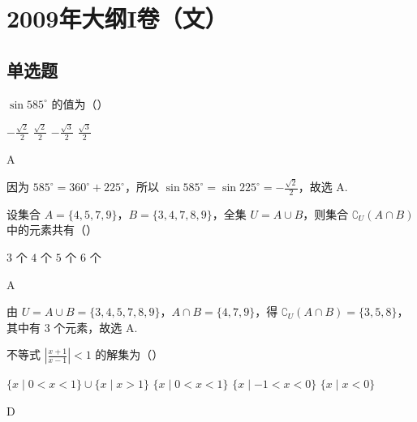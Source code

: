 \chapter{2009年大纲I卷（文）}

\section{单选题}

\begin{problem}
\(\sin 585^{\circ}\) 的值为（\quad）

\choices
    {\(-\frac{\sqrt{2}}{2}\)}
    {\(\frac{\sqrt{2}}{2}\)}
    {\(-\frac{\sqrt{3}}{2}\)}
    {\(\frac{\sqrt{3}}{2}\)}
\end{problem}

\begin{answer}
A
\end{answer}

\begin{solution}
因为 \(585^{\circ}=360^{\circ}+225^{\circ}\)，所以 \(\sin 585^{\circ}=\sin 225^{\circ}=-\frac{\sqrt{2}}{2}\)，故选 A.
\end{solution}

\begin{problem}
设集合 \(A = \{4, 5, 7, 9\}\)，\(B = \{3, 4, 7, 8, 9\}\)，全集 \(U = A \cup B\)，则集合 \(\complement_U (A \cap B)\) 中的元素共有（\quad）

\choices
    {\(3\text{ 个}\)}
    {\(4\text{ 个}\)}
    {\(5\text{ 个}\)}
    {\(6\text{ 个}\)}
\end{problem}

\begin{answer}
A
\end{answer}

\begin{solution}
由 \(U=A\cup B=\{3,4,5,7,8,9\}\)，\(A\cap B=\{4,7,9\}\)，得 \(\complement_U(A\cap B)=\{3,5,8\}\)，其中有 \(3\) 个元素，故选 A.
\end{solution}

\begin{problem}
不等式 \(\left|\frac{x + 1}{x - 1}\right| < 1\) 的解集为（\quad）

\choices
    {\(\{x\mid 0 < x < 1\} \cup \{x\mid x > 1\}\)}
    {\(\{x\mid 0 < x < 1\}\)}
    {\(\{x\mid -1 < x < 0\}\)}
    {\(\{x\mid x < 0\}\)}
\end{problem}

\begin{answer}
D
\end{answer}


